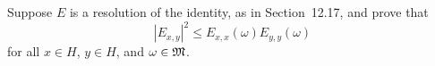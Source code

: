 \begin{enumerate}
\unfinished

\begin{excopy}
Suppose $E$ is a resolution of the identity, as in Section~12.17, and prove that
\begin{equation*}
\left|E_{x,y}\right|^2 \leq E_{x,x}(\omega) E_{y,y}(\omega)
\end{equation*}
for all \(x\in H\), \(y\in H\), and \(\omega \in \mathfrak{M}\).
\end{excopy}
\unfinished

\begin{excopy}
\end{excopy}


\end{enumerate}


